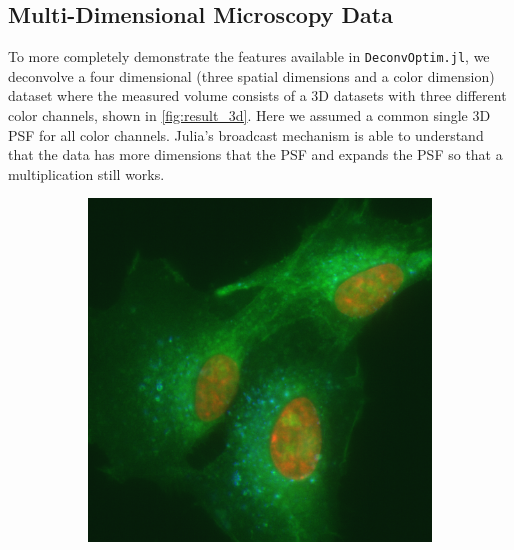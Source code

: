 \documentclass{juliacon}
\begin{document}
    \subsection{Multi-Dimensional Microscopy Data}
        To more completely demonstrate the features available in \verb|DeconvOptim.jl|,
        we deconvolve a four dimensional (three spatial dimensions and a color dimension) dataset where the measured volume consists of a 3D datasets
        with three different color channels, shown in \autoref{fig:result_3d}.
        Here we assumed a common single 3D PSF for all color channels.
        Julia's broadcast mechanism is able to understand that 
        the data has more dimensions that the PSF and expands the PSF so that a multiplication still works.
        \begin{figure}[h]
            \begin{subfigure}{.25\textwidth}
                \centering
                \includegraphics[width = .85\textwidth]{figures/raw_rgb.png}
            \end{subfigure}%
            \begin{subfigure}{.25\textwidth}
                \centering

\end{subfigure}
\end{figure}
\end{document}

